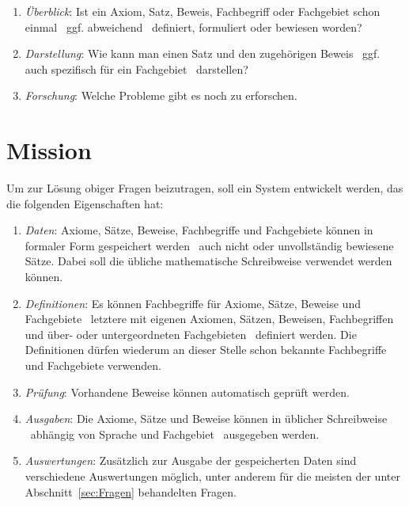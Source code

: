 \documentclass[english,ngerman,parskip=half,headsepline,footsepline]{scrreprt}
\newcounter{Enumi}
\begin{document}
\begin{enumerate}
		\item \label{Frage:Überblick} \emph{Überblick}: Ist ein Axiom, Satz, Beweis, Fachbegriff oder Fachgebiet schon einmal \textendash\ ggf. abweichend \textendash\ definiert, formuliert oder bewiesen worden?
		
		\item \label{Frage:Darstellung} \emph{Darstellung}: Wie kann man einen Satz und den zugehörigen Beweis \textendash\ ggf. auch spezifisch für ein Fachgebiet \textendash\ darstellen?
		
		\item \label{Frage:Forschung} \emph{Forschung}: Welche Probleme gibt es noch zu erforschen.
		
	\end{enumerate}
	
	\section{Mission}
	\label{sec:Mission}
	
	Um zur Lösung obiger Fragen beizutragen, soll ein System entwickelt werden, das die folgenden Eigenschaften hat:
	
	\begin{enumerate}
		
		\item \label{Mission:Daten} \emph{Daten}: Axiome, Sätze, Beweise, Fachbegriffe und Fachgebiete können in formaler Form gespeichert werden \textendash\ auch nicht oder unvollständig bewiesene Sätze. Dabei soll die übliche mathematische Schreibweise verwendet werden können.
		
		\item \label{Mission:Definitionen} \emph{Definitionen}: Es können Fachbegriffe für Axiome, Sätze, Beweise und Fachgebiete \textendash\ letztere mit eigenen Axiomen, Sätzen, Beweisen, Fachbegriffen und über- oder untergeordneten Fachgebieten \textendash\ definiert werden. Die Definitionen dürfen wiederum an dieser Stelle schon bekannte Fachbegriffe und Fachgebiete verwenden.
		
		\item \label{Mission:Prüfung} \emph{Prüfung}: Vorhandene Beweise können automatisch geprüft werden.
		
		\item \label{Mission:Ausgaben} \emph{Ausgaben}: Die Axiome, Sätze und Beweise können in üblicher Schreibweise \textendash\ abhängig von Sprache und Fachgebiet \textendash\ ausgegeben werden.
		
		\item \label{Mission:Auswertungen} \emph{Auswertungen}: Zusätzlich zur Ausgabe der gespeicherten Daten sind verschiedene Auswertungen möglich, unter anderem für die meisten der unter Abschnitt~\vref{sec:Fragen} behandelten Fragen.
		
		\setcounter{Enumi}{\value{enumi}}
	\end{enumerate}
\end{document}
